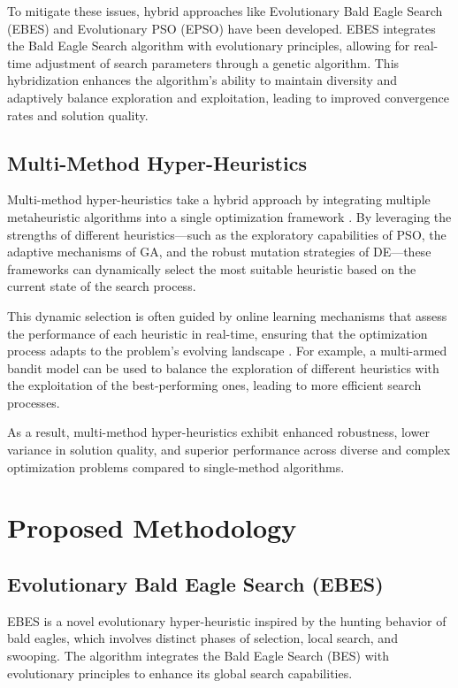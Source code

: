 \documentclass[conference]
{IEEEtran}
\begin{document}
To mitigate these issues, hybrid approaches like Evolutionary Bald Eagle Search (EBES)  and Evolutionary PSO (EPSO) \cite{miranda2021evolutionary} have been developed. EBES integrates the Bald Eagle Search algorithm with evolutionary principles, allowing for real-time adjustment of search parameters through a genetic algorithm. This hybridization enhances the algorithm's ability to maintain diversity and adaptively balance exploration and exploitation, leading to improved convergence rates and solution quality.

\subsection{Multi-Method Hyper-Heuristics}

Multi-method hyper-heuristics take a hybrid approach by integrating multiple metaheuristic algorithms into a single optimization framework \cite{grobler2010alternative}. By leveraging the strengths of different heuristics—such as the exploratory capabilities of PSO, the adaptive mechanisms of GA, and the robust mutation strategies of DE—these frameworks can dynamically select the most suitable heuristic based on the current state of the search process.

This dynamic selection is often guided by online learning mechanisms that assess the performance of each heuristic in real-time, ensuring that the optimization process adapts to the problem's evolving landscape \cite{fialho2010analysis}. For example, a multi-armed bandit model can be used to balance the exploration of different heuristics with the exploitation of the best-performing ones, leading to more efficient search processes.

As a result, multi-method hyper-heuristics exhibit enhanced robustness, lower variance in solution quality, and superior performance across diverse and complex optimization problems compared to single-method algorithms.

\section{Proposed Methodology}

\subsection{Evolutionary Bald Eagle Search (EBES)}

EBES is a novel evolutionary hyper-heuristic inspired by the hunting behavior of bald eagles, which involves distinct phases of selection, local search, and swooping. The algorithm integrates the Bald Eagle Search (BES) with evolutionary principles to enhance its global search capabilities.
\end{document}
